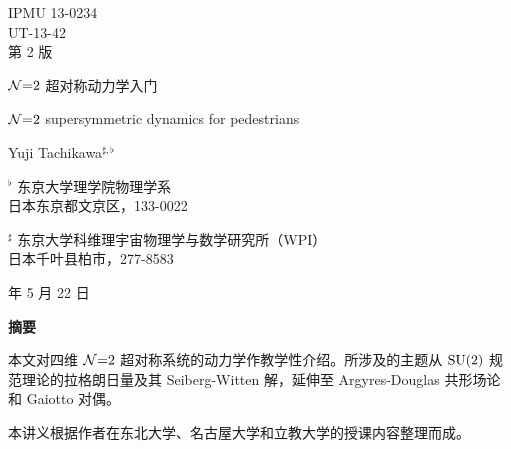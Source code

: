 \documentclass[letterpaper,reqno,11pt]{article}
\begin{document}
\begin{titlepage}
\begin{flushright}
IPMU 13-0234\\
UT-13-42\\
第 2 版
\end{flushright}
\vskip 2cm
\begin{center}
{\LARGE $\mathcal{N}{=}2$ 超对称动力学入门\par}
\bigskip
{\large $\mathcal{N}{=}2$ supersymmetric dynamics for pedestrians\par}
\vskip 1.2cm
{\large Yuji Tachikawa$^{\sharp,\flat}$\par}
\bigskip\bigskip
{\large
$^\flat$ 东京大学理学院物理学系\\
日本东京都文京区，133-0022\par
\medskip
$^\sharp$ 东京大学科维理宇宙物理学与数学研究所（WPI）\\
日本千叶县柏市，277-8583\par
{} 年 5 月 22 日\par}
\vskip 1.5cm
\textbf{摘要}
\end{center}
\begingroup\small
\noindent
本文对四维 $\mathcal{N}{=}2$ 超对称系统的动力学作教学性介绍。所涉及的主题从 $\mathop{\mathrm{SU}}(2)$ 规范理论的拉格朗日量及其 Seiberg-Witten 解，延伸至 Argyres-Douglas 共形场论和 Gaiotto 对偶。

本讲义根据作者在东北大学、名古屋大学和立教大学的授课内容整理而成。
\par\endgroup
\vfill
\end{titlepage}
\tableofcontents
\newpage
\setcounter{section}{-1}














\appendix


\clearpage
{}
{}

\clearpage
{}
{}
\printindex
\end{document}
